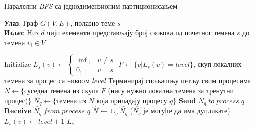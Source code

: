 \begin{algorithm}[H]
\caption{Паралелни \textit{BFS} са једнодимензионим партиционисањем}
\label{algorith:bfs-distance-1D-par-pseudo}
\hspace*{\algorithmicindent} \textbf{Улаз}: Граф $G(V, E)$, полазно теме $s$ \\
\hspace*{\algorithmicindent} \textbf{Излаз}: Низ $d$ чији елементи представљају број скокова од почетног темена $s$ до темена $v_i \in V$
\begin{algorithmic}[1]
\State Initialize $L_s(v) \gets
\begin{cases}
\inf, &v \neq s\\
0, &v = s
\end{cases}
$
\State $F \gets \{ v | L_s(v) = level \}$, скуп локалних темена за процес са нивоом $level$
\State Терминирај спољашњу петљу свим процесима
\EndIf
\State $N \gets \{ $суседна темена из скупа $F$ (нису нужно локална темена за тренутни процес)$\}$
\State $N_q \gets \{$темена из $N$ која припадају процесу $q\}$
\State \textbf{Send} $N_q \; to \; process \; q$
\State \textbf{Receive} $\widehat{N_q} \; from \; process \; q$
\EndFor
\State $\widehat{N} \gets \cup_q \widehat{N_q}$ \; ($\widehat{N_q}$ је могуће да има дупликате)
\State $L_s(v) \gets level + 1$
\EndFor
\EndFor
\State \Return $L_s$
\EndProcedure
\end{algorithmic}
\end{algorithm}